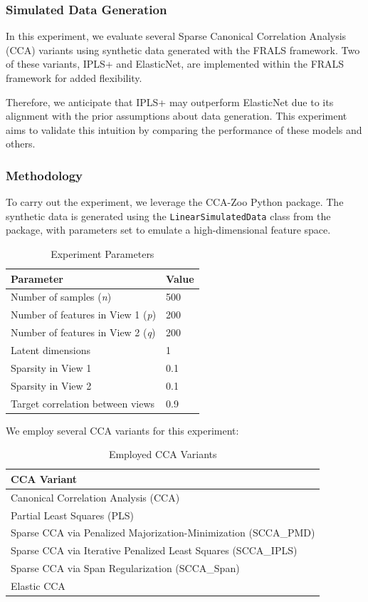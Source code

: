 \subsubsection{Simulated Data Generation}\label{subsubsec:simulated-data-generation}

In this experiment, we evaluate several Sparse Canonical Correlation Analysis (CCA) variants using synthetic data generated with the FRALS framework. Two of these variants, IPLS+ and ElasticNet, are implemented within the FRALS framework for added flexibility.

Therefore, we anticipate that IPLS+ may outperform ElasticNet due to its alignment with the prior assumptions about data generation. This experiment aims to validate this intuition by comparing the performance of these models and others.

\subsubsection{Methodology}

To carry out the experiment, we leverage the CCA-Zoo Python package. The synthetic data is generated using the \texttt{LinearSimulatedData} class from the package, with parameters set to emulate a high-dimensional feature space.

\begin{table}[h]
\centering
\caption{Experiment Parameters}
\begin{tabular}{l|l}
\textbf{Parameter} & \textbf{Value} \\
\hline
Number of samples (\textit{n}) & 500 \\
Number of features in View 1 (\textit{p}) & 200 \\
Number of features in View 2 (\textit{q}) & 200 \\
Latent dimensions & 1 \\
Sparsity in View 1 & 0.1 \\
Sparsity in View 2 & 0.1 \\
Target correlation between views & 0.9 \\
\end{tabular}
\label{table:experiment-parameters}
\end{table}

We employ several CCA variants for this experiment:

\begin{table}[h]
\centering
\caption{Employed CCA Variants}
\begin{tabular}{l}
\textbf{CCA Variant} \\
\hline
Canonical Correlation Analysis (CCA) \\
Partial Least Squares (PLS) \\
Sparse CCA via Penalized Majorization-Minimization (SCCA\_PMD) \\
Sparse CCA via Iterative Penalized Least Squares (SCCA\_IPLS) \\
Sparse CCA via Span Regularization (SCCA\_Span) \\
Elastic CCA \\
\end{tabular}
\label{table:cca-variants}
\end{table}

